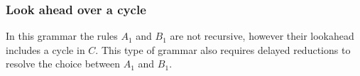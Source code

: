\documentclass[a4paper,11pt]{article}
\begin{document}
%
%




\subsubsection{Look ahead over a cycle}
In this grammar the rules $A_1$ and $B_1$ are not recursive, however their lookahead includes a cycle in $C$. 
This type of grammar also requires delayed reductions to resolve the choice between $A_1$ and $B_1$.
\end{document}
